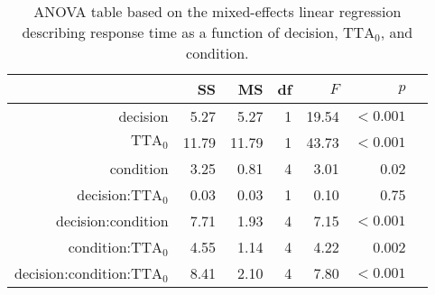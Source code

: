 \begin{table}[h]
\centering
\caption{ANOVA table based on the mixed-effects linear regression describing response time as a function of decision, $\textrm{TTA}_0$, and condition.}
\label{tab:RT}
\begin{tabular}{rrrrrrr}
\toprule
 & SS & MS & df & $F$ & $p$ \\
\midrule
decision & 5.27 & 5.27 & 1 & 19.54 & $<0.001$ \\
$\textrm{TTA}_0$ & 11.79 & 11.79 & 1 & 43.73 & $<0.001$ \\
condition & 3.25 & 0.81 & 4 & 3.01 & 0.02 \\
decision:$\textrm{TTA}_0$ & 0.03 & 0.03 & 1 & 0.10 & 0.75 \\
decision:condition & 7.71 & 1.93 & 4 & 7.15 & $<0.001$ \\
condition:$\textrm{TTA}_0$ & 4.55 & 1.14 & 4 & 4.22 & 0.002 \\
decision:condition:$\textrm{TTA}_0$ & 8.41 & 2.10 & 4 & 7.80 & $<0.001$ \\
\bottomrule
\end{tabular}
\end{table}
